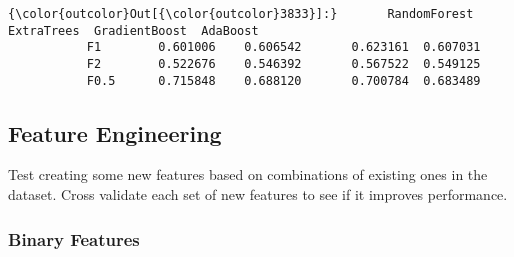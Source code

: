 \documentclass{article}
\begin{document}
            \begin{Verbatim}[commandchars=\\\{\}]
{\color{outcolor}Out[{\color{outcolor}3833}]:}       RandomForest  ExtraTrees  GradientBoost  AdaBoost
           F1        0.601006    0.606542       0.623161  0.607031
           F2        0.522676    0.546392       0.567522  0.549125
           F0.5      0.715848    0.688120       0.700784  0.683489
\end{Verbatim}
        
    \subsection{Feature Engineering}\label{feature-engineering}

Test creating some new features based on combinations of existing ones
in the dataset. Cross validate each set of new features to see if it
improves performance.

    \subsubsection{Binary Features}\label{binary-features}
\end{document}
